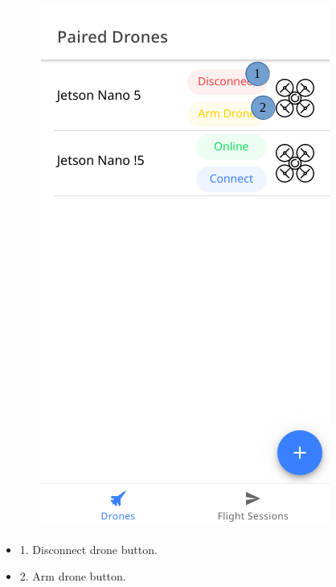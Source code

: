\begin{figure}[h!]
	\centering
	\includegraphics[scale=0.5]{./assets/images/connected.png}
	\label{fig: screens}
	\caption{}
\end{figure}
\newpage
\begin{itemize}
		\item 1. Disconnect drone button.
		\item 2. Arm drone button.
\end{itemize}


